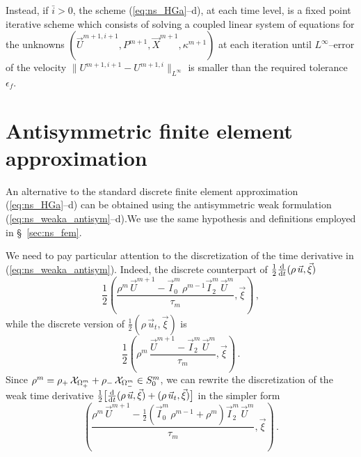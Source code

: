 Instead, if $\bar{i}>0$, the scheme (\ref{eq:ns_HGa}--d), at each time level,
is a fixed point iterative scheme which consists of solving a coupled linear
system of equations for the unknowns $(\vec U^{m+1,i+1}, P^{m+1},
\vec{X}^{m+1}, \kappa^{m+1})$ at each iteration until $L^\infty$--error of the
velocity $\|U^{m+1,i+1}-U^{m+1,i} \|_{L^\infty}$ is smaller than the required
tolerance $\epsilon_f$.

\section{Antisymmetric finite element approximation}\label{sec:ns_fem_antisym}
An alternative to the standard discrete finite element approximation
(\ref{eq:ns_HGa}--d) can be obtained using the antisymmetric weak formulation
(\ref{eq:ns_weaka_antisym}--d).We use the same hypothesis and definitions
employed in \S~\ref{sec:ns_fem}.

We need to pay particular attention to the discretization of the time
derivative in (\ref{eq:ns_weaka_antisym}). Indeed, the discrete counterpart of
$\tfrac{1}{2} \frac{\rm d}{{\rm d}t} (\rho\,\vec u, \vec \xi)$
\begin{equation}
\frac{1}{2}\left(\frac{\rho^{m}\,\vec U^{m+1} - \vec I^m_0\,\rho^{m-1}
\vec I^m_2\,\vec U^m}{\tau_m}, \vec \xi \right)\,,
\end{equation}
while the discrete version of $\tfrac{1}{2}(\rho\,\vec u_t, \vec \xi)$ is
\begin{equation}
\frac{1}{2}\left( \rho^{m}\, \frac{\vec U^{m+1} - \vec I^m_2\, \vec
U^m}{\tau_m}, \vec \xi \right)\,.
\end{equation}
Since $\rho^m = \rho_+\,\mathrm{\mathcal{X}}_{\Omega^m_+} + \rho_-\,\mathrm{\mathcal{X}}_{\Omega^m_-}\in
S^m_0$, we can rewrite the discretization of the weak time derivative
$\tfrac{1}{2}\big[ \frac{\rm d}{{\rm d}t} (\rho\,\vec u, \vec \xi)+(\rho\,\vec u_t, \vec
\xi)\big]$ in the simpler form
\begin{equation}
\left(\frac{\rho^{m}\,\vec U^{m+1} - \tfrac{1}{2}(\vec I^m_0\,\rho^{m-1}+\rho^m)
\vec I^m_2\,\vec U^m}{\tau_m}, \vec \xi \right)\,.
\end{equation}

